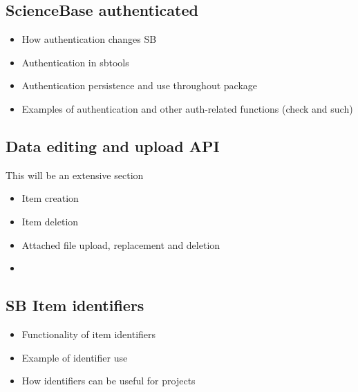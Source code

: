\subsection{ScienceBase authenticated}

\begin{itemize}
	\item{How authentication changes SB}
	\item{Authentication in sbtools}
	\item{Authentication persistence and use throughout package}
	\item{Examples of authentication and other auth-related functions (check and such)}
\end{itemize}


\subsection{Data editing and upload API}
This will be an extensive section
\begin{itemize}
	\item{Item creation}
	\item{Item deletion}
	\item{Attached file upload, replacement and deletion}
	\item{}
\end{itemize}

\subsection{SB Item identifiers}
\begin{itemize}
	\item{Functionality of item identifiers}
	\item{Example of identifier use}
	\item{How identifiers can be useful for projects}
\end{itemize}
